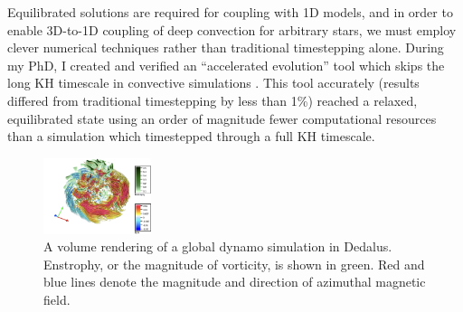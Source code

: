 \documentclass[preprint, hmargin=1in, vmargin=1in]{aastex62}
\begin{document}
Equilibrated solutions are required for coupling with 1D models, and in order to enable 3D-to-1D coupling of deep convection for arbitrary stars, we must employ clever numerical techniques rather than traditional timestepping alone.
During my PhD, I created and verified an ``accelerated evolution'' tool which skips the long KH timescale in convective simulations \citep{anders&all2018}.
This tool accurately (results differed from traditional timestepping by less than 1\%) reached a relaxed, equilibrated state using an order of magnitude fewer computational resources than a simulation which timestepped through a full KH timescale.

\begin{figure}
	\begin{center}
	\vspace{-10pt}
    \includegraphics[width=0.28\textwidth]{./figs/mdwarf.png}
	\vspace{-16pt}
	\end{center}
    \caption{A volume rendering of a global dynamo simulation in Dedalus.
	Enstrophy, or the magnitude of vorticity, is shown in green.
	Red and blue lines denote the magnitude and direction of azimuthal magnetic field.
	\label{fig:mdwarf} }
\end{figure}
\end{document}
